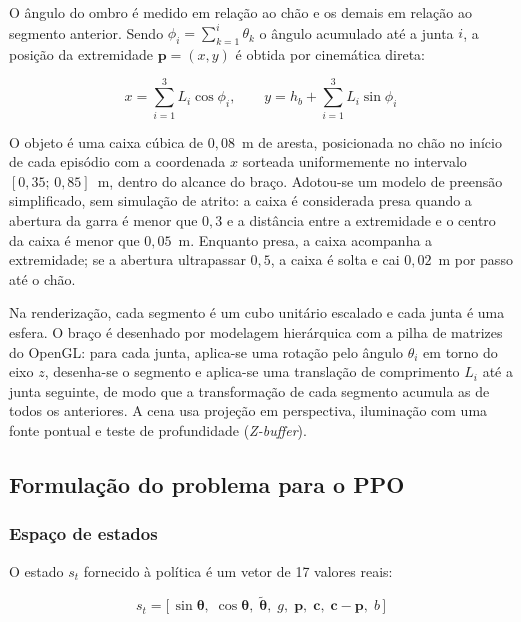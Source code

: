 O ângulo do ombro é medido em relação ao chão e os demais em relação ao segmento anterior. Sendo $\phi_i = \sum_{k=1}^{i} \theta_k$ o ângulo acumulado até a junta $i$, a posição da extremidade $\mathbf{p} = (x, y)$ é obtida por cinemática direta:

\begin{equation}
    x = \sum_{i=1}^{3} L_i \cos \phi_i, \qquad
    y = h_b + \sum_{i=1}^{3} L_i \sin \phi_i
    \label{eq:cinematica}
\end{equation}

O objeto é uma caixa cúbica de $0{,}08$~m de aresta, posicionada no chão no início de cada episódio com a coordenada $x$ sorteada uniformemente no intervalo $[0{,}35;\,0{,}85]$~m, dentro do alcance do braço. Adotou-se um modelo de preensão simplificado, sem simulação de atrito: a caixa é considerada presa quando a abertura da garra é menor que $0{,}3$ e a distância entre a extremidade e o centro da caixa é menor que $0{,}05$~m. Enquanto presa, a caixa acompanha a extremidade; se a abertura ultrapassar $0{,}5$, a caixa é solta e cai $0{,}02$~m por passo até o chão.

Na renderização, cada segmento é um cubo unitário escalado e cada junta é uma esfera. O braço é desenhado por modelagem hierárquica com a pilha de matrizes do OpenGL: para cada junta, aplica-se uma rotação pelo ângulo $\theta_i$ em torno do eixo $z$, desenha-se o segmento e aplica-se uma translação de comprimento $L_i$ até a junta seguinte, de modo que a transformação de cada segmento acumula as de todos os anteriores. A cena usa projeção em perspectiva, iluminação com uma fonte pontual e teste de profundidade (\textit{Z-buffer}).

\subsection{Formulação do problema para o PPO}

\subsubsection{Espaço de estados}

O estado $s_t$ fornecido à política é um vetor de 17 valores reais:

\begin{equation}
    s_t = \big[\, \sin\boldsymbol{\theta},\; \cos\boldsymbol{\theta},\; \tilde{\boldsymbol{\theta}},\; g,\; \mathbf{p},\; \mathbf{c},\; \mathbf{c} - \mathbf{p},\; b \,\big]
    \label{eq:estado}
\end{equation}


